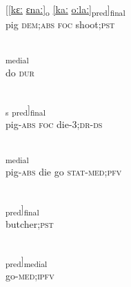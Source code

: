 \documentclass[output=paper]{LSP/langsci}
\begin{document}
\begin{appendixexe}
 \ex \label{Aiex:App43}
\gll \underline{[[kɛː}	\underline{ɛnaː]\textsubscript{o}}	\underline{[kaː}	\underline{oːlaː]}\textsubscript{pred}]\textsubscript{final}\\
pig	\textsc{dem};\textsc{abs}	\textsc{foc}	shoot;\textsc{pst}\\
\glt {}\\
\end{appendixexe}

\begin{appendixexe}
 \ex \label{Aiex:App44}
\textsubscript{medial}\\
do	\textsc{dur}\\
\glt {}\\
\end{appendixexe}

\begin{appendixexe}
 \ex \label{Aiex:App45}
\gll \underline{\smash{[[kɛː-jaː]}}\textsubscript{s}	\underline{\smash{[kaː}}	\underline{\smash{ɡuːduː-saː-bi]}}\textsubscript{pred}]\textsubscript{final}\\
pig-\textsc{abs}	\textsc{foc}	die-3;\textsc{dr}-\textsc{ds}\\
\glt {}\\
\end{appendixexe}

\begin{appendixexe}
 \ex \label{Aiex:App46}
\textsubscript{medial}\\
pig-\textsc{abs}	die	go	\textsc{stat}-\textsc{med};\textsc{pfv}\\
\glt {}\\
\end{appendixexe}

\begin{appendixexe}
 \ex \label{Aiex:App47}
\gll [[joːlaː]\textsubscript{pred}]\textsubscript{final}\\
butcher;\textsc{pst}\\
\glt {}\\
\end{appendixexe}

\begin{appendixexe}
 \ex \label{Aiex:App48}
\gll [[hɛnaː-nɛː]\textsubscript{pred}]\textsubscript{medial}\\
go-\textsc{med};\textsc{ipfv}\\
\glt {}\\
\end{appendixexe}
\end{document}
